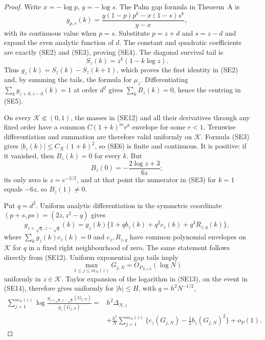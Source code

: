 \begin{proof}
Write \(x=-\log p\), \(y=-\log s\).  The Palm gap formula in Theorem~A is
\[
 g_{p,s}(k)
 =\frac{y(1-p)p^k-x(1-s)s^k}{y-x},
\tag{SE12}
\]
with its continuous value when \(p=s\).  Substitute \(p=z+d\) and \(s=z-d\)
and expand the even analytic function of \(d\).  The constant and quadratic
coefficients are exactly \textup{(SE2)} and \textup{(SE3)}, proving
\textup{(SE4)}.  The diagonal survival tail is
\[
 S_z(k)=z^k(1-k\log z).
\]
Thus \(g_z(k)=S_z(k)-S_z(k+1)\), which proves the first identity in
\textup{(SE2)} and, by summing the tails, the formula for \(\mu_z\).
Differentiating \(\sum_kg_{z+d,z-d}(k)=1\) at order \(d^2\) gives
\(\sum_kB_z(k)=0\), hence the centring in \textup{(SE5)}.

On every \(\mathcal K\Subset(0,1)\), the masses in \textup{(SE12)} and all
their derivatives through any fixed order have a common
\(C(1+k)^m r^k\) envelope for some \(r<1\).  Termwise differentiation and
summation are therefore valid uniformly on \(\mathcal K\).  Formula
\textup{(SE3)} gives \(|b_z(k)|\le C_{\mathcal K}(1+k)^2\), so
\textup{(SE6)} is finite and continuous.  It is positive: if it vanished,
then \(B_z(k)=0\) for every \(k\).  But
\[
 B_z(0)=-\frac{2\log z+3}{6z};
\]
its only zero is \(z=e^{-3/2}\), and at that point the numerator in
\textup{(SE3)} for \(k=1\) equals \(-6z\), so \(B_z(1)\ne0\).

Put \(q=d^2\).  Uniform analytic differentiation in the symmetric coordinate
\((p+s,ps)=(2z,z^2-q)\) gives
\[
 g_{z+\sqrt q,z-\sqrt q}(k)
 =g_z(k)\{1+qb_z(k)+q^2c_z(k)+q^3R_{z,q}(k)\},
\tag{SE13}
\]
where \(\sum_kg_z(k)c_z(k)=0\) and \(c_z,R_{z,q}\) have common polynomial
envelopes on \(\mathcal K\) for \(q\) in a fixed right neighbourhood of zero.
The same statement follows directly from \textup{(SE12)}.  Uniform
exponential gap tails imply
\[
 \max_{1\le j\le m_N(z)}G_{j,N}=O_{P_{N,z,0}}(\log N)
\tag{SE14}
\]
uniformly in \(z\in\mathcal K\).  Taylor expansion of the logarithm in
\textup{(SE13)}, on the event in \textup{(SE14)}, therefore gives uniformly
for \(|h|\le H\), with \(q=h^2N^{-1/2}\),
\[
\begin{split}
\sum_{j=1}^{m_N(z)}\log
\frac{g_{z+\sqrt q,z-\sqrt q}(G_{j,N})}{g_z(G_{j,N})}
={}&h^2\Delta_{N,z}\\
&+\frac{h^4}{N}\sum_{j=1}^{m_N(z)}
\{c_z(G_{j,N})-\tfrac12b_z(G_{j,N})^2\}+o_P(1).
\end{split}
\tag{SE15}
\]


\end{proof}
